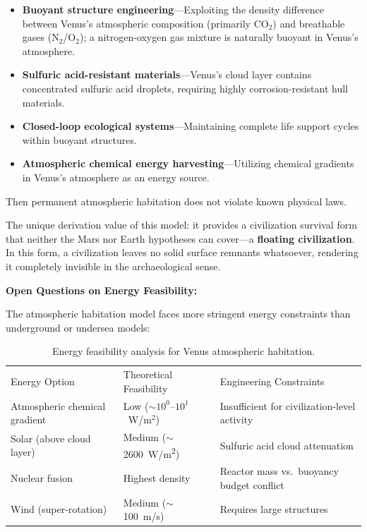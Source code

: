 \documentclass[aps,prd,twocolumn,superscriptaddress,nofootinbib]{revtex4-2}
\begin{document}
\begin{itemize}
  \item \textbf{Buoyant structure engineering}---Exploiting the density difference between Venus's atmospheric composition (primarily CO$_2$) and breathable gases (N$_2$/O$_2$); a nitrogen-oxygen gas mixture is naturally buoyant in Venus's atmosphere.
  \item \textbf{Sulfuric acid-resistant materials}---Venus's cloud layer contains concentrated sulfuric acid droplets, requiring highly corrosion-resistant hull materials.
  \item \textbf{Closed-loop ecological systems}---Maintaining complete life support cycles within buoyant structures.
  \item \textbf{Atmospheric chemical energy harvesting}---Utilizing chemical gradients in Venus's atmosphere as an energy source.
\end{itemize}

Then permanent atmospheric habitation does not violate known physical laws.

The unique derivation value of this model: it provides a civilization survival form that neither the Mars nor Earth hypotheses can cover---a \textbf{floating civilization}. In this form, a civilization leaves no solid surface remnants whatsoever, rendering it completely invisible in the archaeological sense.

\textbf{Open Questions on Energy Feasibility:}

The atmospheric habitation model faces more stringent energy constraints than underground or undersea models:

\begin{table}[htbp]
\caption{Energy feasibility analysis for Venus atmospheric habitation.}
\label{tab:venus-energy}
\begin{ruledtabular}
\begin{tabular}{lll}
Energy Option & Theoretical Feasibility & Engineering Constraints \\
\colrule
Atmospheric chemical gradient & Low (${\sim}10^{0}$--$10^{1}$~W/m$^2$) & Insufficient for civilization-level activity \\
Solar (above cloud layer) & Medium (${\sim}$\SI{2600}{W/m^2}) & Sulfuric acid cloud attenuation \\
Nuclear fusion & Highest density & Reactor mass vs.\ buoyancy budget conflict \\
Wind (super-rotation) & Medium (${\sim}$\SI{100}{m/s}) & Requires large structures \\
\end{tabular}
\end{ruledtabular}
\end{table}
\end{document}

